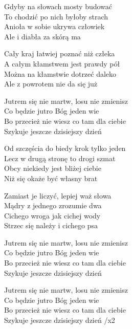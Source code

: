 \begin{text}
Gdyby na słowach mosty budować\\
To chodzić po nich byłoby strach\\
Anioła w sobie ukrywa człowiek\\
Ale i diabła za skórą ma

Cały kraj łatwiej poznać niż człeka\\
A całym kłamstwem jest prawdy pół\\
Można na kłamstwie dotrzeć daleko\\
Ale z powrotem nie da się już

Jutrem się nie martw, losu nie zmienisz\\
Co będzie jutro Bóg jeden wie\\
Bo przecież nie wiesz co tam dla ciebie\\
Szykuje jeszcze dzisiejszy dzień

Od szczęścia do biedy krok tylko jeden\\
Lecz w drugą stronę to drogi szmat\\
Obcy niekiedy jest bliżej ciebie\\
Niż się okaże być własny brat

Zamiast je liczyć, lepiej waż słowa\\
Mądry z jednego zrozumie dwa\\
Cichego wroga jak cichej wody\\
Strzec się należy i cichego psa

Jutrem się nie martw, losu nie zmienisz\\
Co będzie jutro Bóg jeden wie\\
Bo przecież nie wiesz co tam dla ciebie\\
Szykuje jeszcze dzisiejszy dzień

Jutrem się nie martw, losu nie zmienisz\\
Co będzie jutro Bóg jeden wie\\
Bo przecież nie wiesz co tam dla ciebie\\
Szykuje jeszcze dzisiejszy dzień /x2
\end{text}
